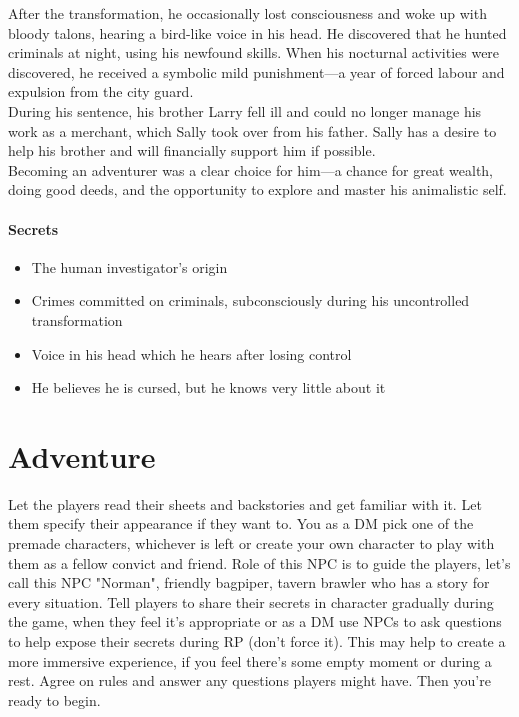 \documentclass[10pt,onecolumn,twoside,openany,bg=full,layout=true]{dndbook}
\begin{document}
After the transformation, he occasionally lost consciousness and woke up with bloody talons,
hearing a bird-like voice in his head.
He discovered that he hunted criminals at night, using his newfound skills.
When his nocturnal activities were discovered, he received a symbolic mild punishment—a year of forced labour and
expulsion from the city guard.\\

During his sentence, his brother Larry fell ill and could no longer manage his work as a merchant,
which Sally took over from his father.
Sally has a desire to help his brother and will financially support him if possible.\\

Becoming an adventurer was a clear choice for him—a chance for great wealth, doing good deeds, and the opportunity to
explore and master his animalistic self.\\

\subsubsection{Secrets}
\begin{itemize}
  \item The human investigator's origin
  \item Crimes committed on criminals, subconsciously during his uncontrolled transformation
  \item Voice in his head which he hears after losing control
  \item He believes he is cursed, but he knows very little about it
\end{itemize}

\vfill

\chapter{Adventure}\label{ch:adventure}
Let the players read their sheets and backstories and get familiar with it.
Let them specify their appearance if they want to.
You as a DM pick one of the premade characters, whichever is left or create your own character to play with them as a fellow convict and
friend.
Role of this NPC is to guide the players, let's call this NPC "Norman", friendly bagpiper, tavern brawler who has a story for every situation.
Tell players to share their secrets in character gradually during the game, when they feel it's appropriate or as a DM use
NPCs to ask questions to help expose their secrets during RP (don't force it).
This may help to create a more immersive experience, if you feel there's some empty moment or during a rest.
Agree on rules and answer any questions players might have.
Then you're ready to begin.
\end{document}
